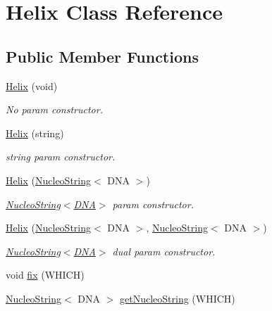 \hypertarget{class_helix}{\section{Helix Class Reference}
\label{class_helix}
}
\subsection*{Public Member Functions}
\begin{DoxyCompactItemize}
\item 
\hyperlink{class_helix_a38c5184accbcfa70d7f2e9651b36816e}{Helix} (void)
\begin{DoxyCompactList}\small\item\em No param constructor. \end{DoxyCompactList}\item 
\hyperlink{class_helix_a232f6908372b90cc08c34c8173bc7c18}{Helix} (string)
\begin{DoxyCompactList}\small\item\em string param constructor. \end{DoxyCompactList}\item 
\hyperlink{class_helix_a5f8fcd37b8c001a49c3ebe23e2e755ec}{Helix} (\hyperlink{class_nucleo_string}{Nucleo\-String}$<$ D\-N\-A $>$)
\begin{DoxyCompactList}\small\item\em \hyperlink{class_nucleo_string}{Nucleo\-String$<$\-D\-N\-A$>$} param constructor. \end{DoxyCompactList}\item 
\hyperlink{class_helix_a591c05c017211f1ee28354a46fbcd66e}{Helix} (\hyperlink{class_nucleo_string}{Nucleo\-String}$<$ D\-N\-A $>$, \hyperlink{class_nucleo_string}{Nucleo\-String}$<$ D\-N\-A $>$)
\begin{DoxyCompactList}\small\item\em \hyperlink{class_nucleo_string}{Nucleo\-String$<$\-D\-N\-A$>$} dual param constructor. \end{DoxyCompactList}\item 
void \hyperlink{class_helix_aba7c805116712315f804915dfecd6330}{fix} (W\-H\-I\-C\-H)
\item 
\hyperlink{class_nucleo_string}{Nucleo\-String}$<$ D\-N\-A $>$ \hyperlink{class_helix_ae4e28a7d1dbb66eb0abf4817cdba9fd8}{get\-Nucleo\-String} (W\-H\-I\-C\-H)
\end{DoxyCompactItemize}


